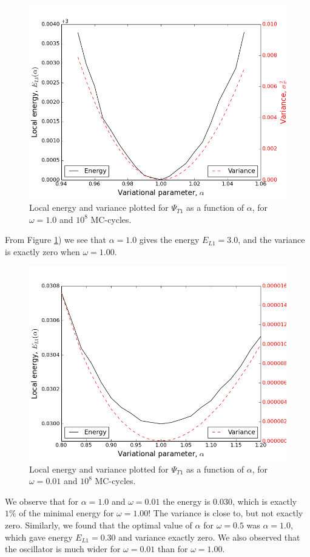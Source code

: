 \documentclass[norsk,a4paper,12pt]{article}
\begin{document}
\begin{figure} [H]
    \centering
    \includegraphics[scale=0.65]{E_L1_variance_omega=1_0}
    \caption{Local energy and variance plotted  for $\Psi_{T1}$ as a function of $\alpha$, for $\omega = 1.0$ and $10^8$ MC-cycles.}
    \label{fig:E_L1_file_omega=1_0}
\end{figure} 
From Figure \ref{fig:E_L1_file_omega=1_0}) we see that $\alpha = 1.0$ gives the energy $E_{L1}=3.0$, and the variance is exactly zero when $\omega=1.00$.

\begin{figure} [H]
    \centering
    \includegraphics[scale=0.65]{E_L1_variance_omega=0_01_1e8.png}
    \caption{Local energy and variance plotted  for $\Psi_{T1}$ as a function of $\alpha$, for $\omega = 0.01$ and $10^8$ MC-cycles.}
    \label{fig:E_L1_file_omega=0_01}
\end{figure} 
We observe that for $\alpha = 1.0$ and $\omega = 0.01$ the energy is $0.030$, which is exactly $1\%$ of the minimal energy for $\omega=1.00$! The variance is close to, but not exactly zero. Similarly, we found that the optimal value of $\alpha$ for $\omega = 0.5$ was $\alpha = 1.0$, which gave energy $E_{L1} = 0.30$ and variance exactly zero. We also observed that the oscillator is much wider for $\omega=0.01$ than for $\omega=1.00$.
\end{document}
